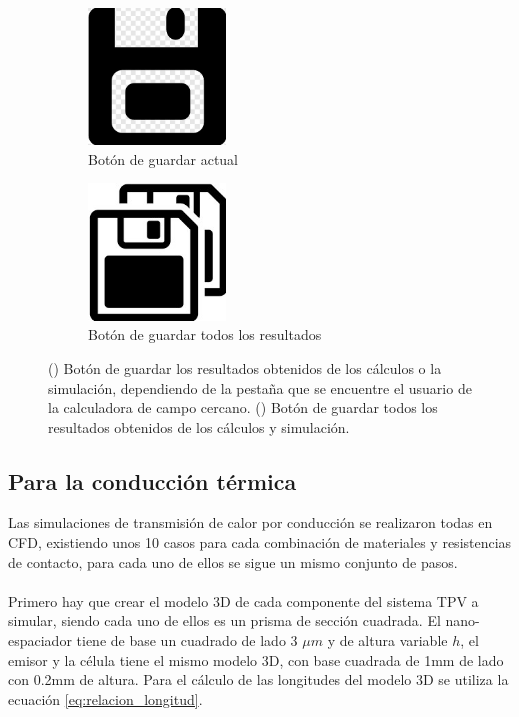 \begin{figure}[H]
	\centering
	\begin{subfigure}[b]{0.48\textwidth}
		\centering
		\includegraphics[width=0.4\textwidth]{figuras/Procedimiento_Simulaciones/Radiacion/SaveButton_Cut.jpg}
		\caption{Botón de guardar actual}
		\label{fig:SaveButton_Cut}
	\end{subfigure}
  \hfill
	\begin{subfigure}[b]{0.48\textwidth}
		\centering
			\includegraphics[width=0.40\textwidth]{figuras/Procedimiento_Simulaciones/Radiacion/SaveAllicon.jpg}
		\caption{Botón de guardar todos los resultados}
		\label{fig:SaveAllicon}
	\end{subfigure}
	\caption{() Botón de guardar los resultados obtenidos de los cálculos o la simulación, dependiendo de la pestaña que se encuentre el usuario de la calculadora de campo cercano. () Botón de guardar todos los resultados obtenidos de los cálculos y simulación.}
	\label{fig:saveButtons}
\end{figure}
\subsection{Para la conducción térmica}
Las simulaciones de transmisión de calor por conducción se realizaron todas en CFD, existiendo unos 10 casos para cada combinación de materiales y resistencias de contacto, para cada uno de ellos se sigue un mismo conjunto de pasos. \\\\
Primero hay que crear el modelo 3D de cada componente del sistema TPV a simular, siendo cada uno de ellos es un prisma de sección cuadrada. El nano-espaciador tiene de base un cuadrado de lado 3 $\mu m$ y de altura variable $h$, el emisor y la célula tiene el mismo modelo 3D, con base cuadrada de 1mm de lado con 0.2mm de altura. Para el cálculo de las longitudes del modelo 3D se utiliza la ecuación \eqref{eq:relacion_longitud}.
